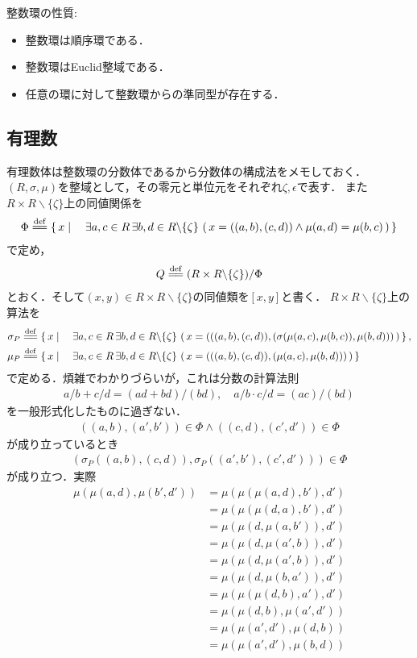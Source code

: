 	整数環の性質:
	\begin{itemize}
		\item 整数環は順序環である．
		\item 整数環はEuclid整域である．
		\item 任意の環に対して整数環からの準同型が存在する．
	\end{itemize}
	
\subsection{有理数}
	有理数体は整数環の分数体であるから分数体の構成法をメモしておく．
	$(R,\sigma,\mu)$を整域として，その零元と単位元をそれぞれ$\zeta,\epsilon$で表す．
	また$R \times R \backslash \{\zeta\}$上の同値関係を
	\begin{align}
		\Phi \defeq \Set{x}{\exists a,c \in R\, \exists b,d \in R \backslash \{\zeta\}\, \left(\, x=((a,b),(c,d)) \wedge \mu(a,d) = \mu(b,c)\, \right)}
	\end{align}
	で定め，
	\begin{align}
		Q \defeq (R \times R \backslash \{\zeta\}) / \Phi
	\end{align}
	とおく．そして$(x,y) \in R \times R \backslash \{\zeta\}$の同値類を$[x,y]$と書く．
	$R \times R \backslash \{\zeta\}$上の算法を
	\begin{align}
		\sigma_P &\defeq \Set{x}{\exists a,c \in R\, \exists b,d \in R \backslash \{\zeta\}\, \left(\, x=(((a,b),(c,d)),(\sigma(\mu(a,c),\mu(b,c)),\mu(b,d)))\, \right)}, \\
		\mu_P &\defeq \Set{x}{\exists a,c \in R\, \exists b,d \in R \backslash \{\zeta\}\, \left(\, x=(((a,b),(c,d)),(\mu(a,c),\mu(b,d)))\, \right)}
	\end{align}
	で定める．煩雑でわかりづらいが，これは分数の計算法則
	\begin{align}
		a/b + c/d = (ad + bd)/(bd),\quad a/b \cdot c/d = (ac)/(bd)
	\end{align}
	を一般形式化したものに過ぎない．
	\begin{align}
		((a,b),(a',b')) \in \Phi \wedge ((c,d),(c',d')) \in \Phi
	\end{align}
	が成り立っているとき
	\begin{align}
		\left(\sigma_P((a,b),(c,d)),\sigma_P((a',b'),(c',d'))\right) \in \Phi
	\end{align}
	が成り立つ．実際
	\begin{align}
		\mu(\mu(a,d),\mu(b',d')) &= \mu(\mu(\mu(a,d),b'),d') \\
		&= \mu(\mu(\mu(d,a),b'),d') \\
		&= \mu(\mu(d,\mu(a,b')),d') \\
		&= \mu(\mu(d,\mu(a',b)),d') \\
		&= \mu(\mu(d,\mu(a',b)),d') \\
		&= \mu(\mu(d,\mu(b,a')),d') \\
		&= \mu(\mu(\mu(d,b),a'),d') \\
		&= \mu(\mu(d,b),\mu(a',d')) \\
		&= \mu(\mu(a',d'),\mu(d,b)) \\
		&= \mu(\mu(a',d'),\mu(b,d)) \\
	\end{align}
